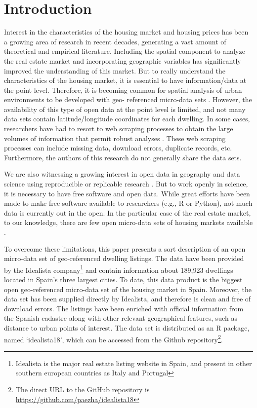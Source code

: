 \documentclass[Royal,times,sageh]{sagej}
\begin{document}
\hypertarget{introduction}{%
\section{Introduction}\label{introduction}}

Interest in the characteristics of the housing market and housing prices
has been a growing area of research in recent decades, generating a vast
amount of theoretical and empirical literature. Including the spatial
component to analyze the real estate market and incorporating geographic
variables has significantly improved the understanding of this market.
But to really understand the characteristics of the housing market, it
is essential to have information/data at the point level. Therefore, it
is becoming common for spatial analysis of urban environments to be
developed with geo- referenced micro-data sets \citep{lopez2015}.
However, the availability of this type of open data at the point level
is limited, and not many data sets contain latitude/longitude
coordinates for each dwelling. In some cases, researchers have had to
resort to web scraping processes to obtain the large volumes of
information that permit robust analyses
\citep{gupta2022take, arbia2020spatial, Li2019, lopez2015}. These web
scraping processes can include missing data, download errors, duplicate
records, etc. Furthermore, the authors of this research do not generally
share the data sets.

We are also witnessing a growing interest in open data in geography and
data science \citep{arribasl2021editorial, arribas2021} using
reproducible or replicable research \citep{paez2021open}. But to work
openly in science, it is necessary to have free software and open data.
While great efforts have been made to make free software available to
researchers (e.g., R or Python), not much data is currently out in the
open. In the particular case of the real estate market, to our
knowledge, there are few open micro-data sets of housing markets
available \citep{Song2021}.

To overcome these limitations, this paper presents a sort description of
an open micro-data set of geo-referenced dwelling listings. The data
have been provided by the Idealista
company\footnote{Idealista is the major real estate listing website in Spain, and present in other southern european countries as Italy and Portugal}
and contain information about 189,923 dwellings located in Spain's three
largest cities. To date, this data product is the biggest open
geo-referenced micro-data set of the housing market in Spain. Moreover,
the data set has been supplied directly by Idealista, and therefore is
clean and free of download errors. The listings have been enriched with
official information from the Spanish cadastre along with other relevant
geographical features, such as distance to urban points of interest. The
data set is distributed as an R package, named `idealista18', which can
be accessed from the Github
repository\footnote{The direct URL to the GitHub repository is \url{https://github.com/paezha/idealista18}}.
\end{document}
